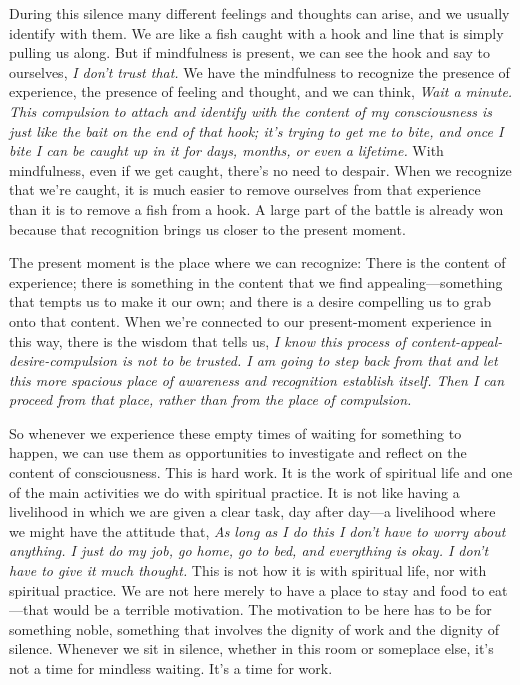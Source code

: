 During this silence many different feelings and thoughts can arise, and
we usually identify with them. We are like a fish caught with a hook and
line that is simply pulling us along. But if mindfulness is present, we
can see the hook and say to ourselves, \emph{I don't trust that.} We
have the mindfulness to recognize the presence of experience, the
presence of feeling and thought, and we can think, \emph{Wait a minute.
This compulsion to \mbox{attach} and identify with the content of my
consciousness is just like the bait on the end of that hook; it's trying
to get me to bite, and once I bite I can be caught up in it for days,
months, or even a lifetime.} With mindfulness, even if we get caught,
there's no need to despair. When we recognize that we're caught, it is
much easier to remove ourselves from that experience than it is to
remove a fish from a hook. A large part of the battle is already won
because that recognition brings us closer to the present moment.

The present moment is the place where we can recognize: There is the 
content of experience; there is something in the content that we find 
appealing---something that tempts us to make it our own; and there is a 
desire compelling us to grab onto that content. When we're connected to 
our present-moment experience in this way, there is the wisdom that 
tells us, \emph{I know this process of content-appeal-desire-compulsion 
is not to be trusted. I am going to step back from that and let this 
more spacious place of awareness and recognition establish itself. Then 
I can proceed from that place, rather than from the place of 
compulsion.}

So whenever we experience these empty times of waiting for something to 
happen, we can use them as opportunities to investigate and reflect on 
the content of consciousness. This is hard work. It is the work of 
spiritual life and one of the main activities we do with spiritual 
practice. It is not like having a livelihood in which we are given a 
clear task, day after day---a livelihood where we might have the 
attitude that, \emph{As long as I do this I don't have to worry about 
anything. I just do my job, go home, go to bed, and everything is okay. 
I don't have to give it much thought.} This is not how it is with 
spiritual life, nor with spiritual practice. We are not here merely to 
have a place to stay and food to eat---that would be a terrible 
motivation. The motivation to be here has to be for something noble, 
something that involves the dignity of work and the dignity of silence. 
Whenever we sit in silence, whether in this room or someplace else, 
it's not a time for mindless waiting. It's a time for work.

